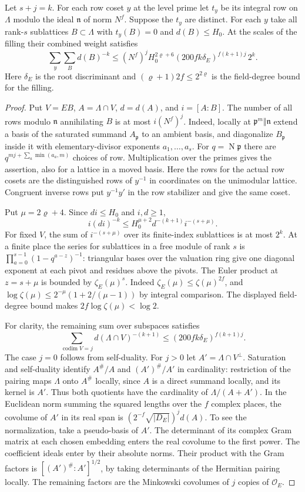 \begin{lemma}\label{lem:pair-row-count}
Let $s+j=k$. For each row coset $y$ at the level prime let $t_y$ be its
integral row on $\Lambda$ modulo the ideal $\mathfrak n$ of norm $N^f$.
Suppose the $t_y$ are distinct. For each $y$ take all rank-$s$ sublattices
$B\subset\Lambda$ with $t_y(B)=0$ and $d(B)\le H_0$. At the scales
of the filling their combined weight satisfies
\[
 \sum_y\sum_B d(B)^{-k}
 \le (N^f)^j H_0^{2\varrho+6}
 (200fk\delta_E)^{f(k+1)j}\,2^k .
\]
Here $\delta_E$ is the root discriminant and $(\varrho+1)2f\le2^{2\varrho}$
is the field-degree bound for the filling.
\end{lemma}
\begin{proof}
Put $V=EB$, $A=\Lambda\cap V$, $d=d(A)$, and $i=[A:B]$.
The number of all rows modulo $\mathfrak n$ annihilating $B$ is at most
$i(N^f)^j$. Indeed, locally at $\mathfrak p^m\Vert\mathfrak n$ extend a
basis of the saturated summand $A_{\mathfrak p}$ to an ambient basis,
and diagonalize $B_{\mathfrak p}$ inside it with elementary-divisor
exponents $a_1,\ldots,a_s$. For $q=\operatorname{N}\mathfrak p$
there are $q^{mj+\sum_a\min(a_a,m)}$ choices of row. Multiplication over
the primes gives the assertion, also for a lattice in a moved basis.
Here the rows for the actual row cosets are the distinguished rows of
$y^{-1}$ in coordinates on the unimodular lattice. Congruent inverse
rows put $y^{-1}y'$ in the row stabilizer and give the same coset.

Put $\mu=2\varrho+4$. Since $di\le H_0$ and $i,d\ge1$,
\[
 i(di)^{-k}\le H_0^{\mu+2} d^{-(k+1)} i^{-(s+\mu)}.
\]
For fixed $V$, the sum of $i^{-(s+\mu)}$ over its finite-index sublattices
is at most $2^k$. At a finite place the series for sublattices in a
free module of rank $s$ is $\prod_{a=0}^{s-1}(1-q^{a-z})^{-1}$:
triangular bases over the valuation ring give one diagonal exponent
at each pivot and residues above the pivots. The Euler product at
$z=s+\mu$ is bounded by $\zeta_E(\mu)^s$.
Indeed $\zeta_E(\mu)\le\zeta(\mu)^{2f}$, and
$\log\zeta(\mu)\le 2^{-\mu}(1+2/(\mu-1))$ by integral comparison.
The displayed field-degree bound makes $2f\log\zeta(\mu)<\log 2$.

For clarity, the remaining sum over subspaces satisfies
\[
 \sum_{\operatorname{codim} V=j} d(\Lambda\cap V)^{-(k+1)}
 \le (200fk\delta_E)^{f(k+1)j}.
\]
The case $j=0$ follows from self-duality. For $j>0$ let
$A'=\Lambda\cap V^\perp$. Saturation and self-duality identify
$A^\#/A$ and $(A')^\#/A'$ in cardinality: restriction of the pairing
maps $\Lambda$ onto $A^\#$ locally, since $A$ is a direct summand
locally, and its kernel is $A'$. Thus both quotients have the cardinality
of $\Lambda/(A+A')$. In the Euclidean norm summing the squared lengths
over the $f$ complex places, the covolume of $A'$ in its real span is
$(2^{-f}\sqrt{|D_E|})^j d(A)$. To see the normalization, take a
pseudo-basis of $A'$. The determinant of its complex Gram matrix at
each chosen embedding enters the real covolume to the first power.
The coefficient ideals enter by their absolute norms. Their product
with the Gram factors is $[(A')^\#:A']^{1/2}$, by taking determinants
of the Hermitian pairing locally. The remaining factors are the
Minkowski covolumes of $j$ copies of $\mathcal O_E$.


\end{proof}
